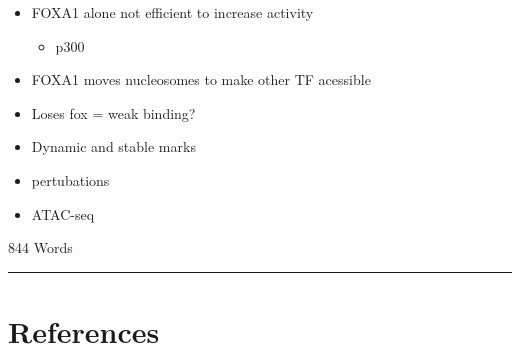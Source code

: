 \documentclass[
  12pt,
]{article}
\providecommand{\tightlist}{%
  \setlength{\itemsep}{0pt}\setlength{\parskip}{0pt}}
\begin{document}
\begin{itemize}
\item
  FOXA1 alone not efficient to increase activity

  \begin{itemize}
  \tightlist
  \item
    p300
  \end{itemize}
\item
  FOXA1 moves nucleosomes to make other TF acessible
\item
  Loses fox = weak binding?
\item
  Dynamic and stable marks
\item
  pertubations
\end{itemize}

\begin{itemize}
\tightlist
\item
  ATAC-seq
\end{itemize}

\begin{flushright}
844 Words
\end{flushright}

\begin{center}\rule{0.5\linewidth}{0.5pt}\end{center}

\hypertarget{references}{%
\section*{References}\label{references}}
\end{document}
